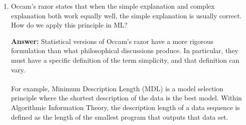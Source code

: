 \documentclass{article}
\newenvironment{QandA}{\begin{enumerate}[label=\arabic*.]}{\end{enumerate}}
\newenvironment{InnerQandA}{\begin{enumerate}[label=\roman*.]}{\end{enumerate}}
\newenvironment{answer}{\par\normalfont \textbf{Answer:}}{}
\begin{document}
\begin{QandA}
\begin{InnerQandA}
        \item Why is it empirical?
        \begin{answer}
            In practice, the risk $R(h)$ cannot be computed because the distribution $P(x, y)$ is unavailable. However, we can compute an approximation, called empirical risk, by averaging the loss function on the training set:
            \begin{align*}
                R_{\text{emp}} = \frac{1}{n}\sum_{i=1}^n L(h(x_i), y_i) 
            \end{align*}
            The empirical risk minimization principle states that the learning algorithm should choose a hypothesis $\hat{h}$ which minimizes the empirical risk:
            \begin{align*}
                \hat{h} = \argmin_{h \in \mathcal{H}} R_{\text{emp}}(h)
            \end{align*}
        \end{answer}

        \item How do we minimize that risk?
        \begin{answer}
            Empirical risk minimization for a classification problem with a 0-1 loss function is known to be an NP-hard problem even for linear classifiers. \\\\
            In practice, machine learning algorithms cope with this problem by employing a convex approximation to the 0-1 (like hinge loss for SVM), which is easier to optimize.
        \end{answer}
        
        (Source: \href{https://en.wikipedia.org/wiki/Empirical_risk_minimization}{Wikipedia})
    \end{InnerQandA}

    \item Occam's razor states that when the simple explanation and complex explanation both work equally well, the simple explanation is usually correct. How do we apply this principle in ML?
    \begin{answer}
        Statistical versions of Occam's razor have a more rigorous formulation than what philosophical discussions produce. In particular, they must have a specific definition of the term simplicity, and that definition can vary. \\\\
        For example, Minimum Description Length (MDL) is a model selection principle where the shortest description of the data is the best model. Within Algorithmic Information Theory, the description length of a data sequence is defined as the length of the smallest program that outputs that data set. 
    

\end{answer}
\end{QandA}
\end{document}
